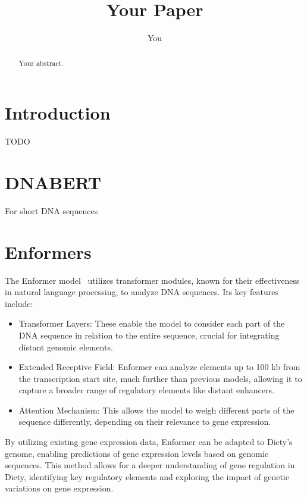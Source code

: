 \documentclass{article}
\title{Your Paper}
\author{You}
\begin{document}
\maketitle

\begin{abstract}
Your abstract.
\end{abstract}

\section{Introduction}

TODO

\section{DNABERT}
For short DNA sequences


\section{Enformers}
The Enformer model~\cite{avsec2021effective} utilizes transformer modules, known for their effectiveness in natural language processing, to analyze DNA sequences. Its key features include:
\begin{itemize}
    \item Transformer Layers: These enable the model to consider each part of the DNA sequence in relation to the entire sequence, crucial for integrating distant genomic elements.
    \item Extended Receptive Field: Enformer can analyze elements up to 100 kb from the transcription start site, much further than previous models, allowing it to capture a broader range of regulatory elements like distant enhancers.
    \item Attention Mechanism: This allows the model to weigh different parts of the sequence differently, depending on their relevance to gene expression.
\end{itemize}
By utilizing existing gene expression data, Enformer can be adapted to Dicty's genome, enabling predictions of gene expression levels based on genomic sequences. This method allows for a deeper understanding of gene regulation in Dicty, identifying key regulatory elements and exploring the impact of genetic variations on gene expression. 




\end{document}
